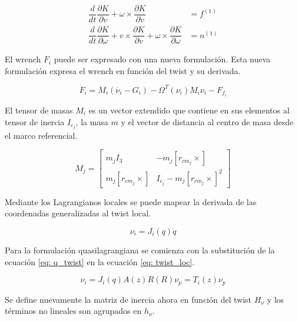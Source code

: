 \begin{subequations}\label{eq: kirchoff}
 \begin{align}
  \dfrac{d}{dt} \dfrac{\partial K}{\partial   v} +   \omega \times \dfrac{\partial K}{\partial   v} &=   f^{(1)}\\
  \dfrac{d}{dt} \dfrac{\partial K}{\partial   \omega} +   v \times \dfrac{\partial K}{\partial   v}  +   \omega \times \dfrac{\partial K}{\partial   \omega} &=   n^{(1)}
 \end{align}
\end{subequations}

El wrench $F_i$ puede ser expresado con  una nueva formulación.
Esta nueva formulación expresa el wrench en función del twist y su derivada.

\begin{equation}
F_i = M_i(\dot{\nu_i} - G_i) - \Omega^T(\nu_i)M_i\nu_i - F_{f_{i}}
\end{equation}

El tensor de masas $M_i$ es un vector extendido que contiene en sus elementos al tensor de inercia $I_{c_j}$, la masa $m$ y el vector de distancia al centro de masa desde el marco referencial.

\begin{equation}
 M_j = \begin{bmatrix}
        m_j I_3 & -m_j [  r_{cm_j} \times]\\
        m_j [  r_{cm_j} \times] & I_{c_j} -m_j [  r_{cm_j} \times]^2
      \end{bmatrix}
\end{equation}

Mediante los Lagrangianos locales se puede mapear la derivada de las coordenadas generalizadas al twist local.

\begin{equation} \label{eq: twist_loc}
\nu_i = J_i(q)\dot{q}
\end{equation}

Para la formulación quasilagrangiana se comienza con la substitución de la ecuación 
\eqref{eq: q_twist} en la ecuación \eqref{eq: twist_loc}.

\begin{equation}
\nu_i = J_i(q) A(z) R(R) \nu_p = T_i(z) \nu_p
\end{equation}

Se define nuevamente la matriz de inercia ahora en función del twist $H_\nu$ y los términos no lineales son agrupados en $h_\nu$.

